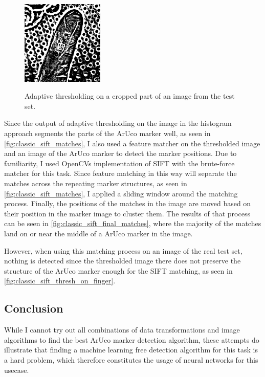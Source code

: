 \documentclass[10pt]{book}
\newcommand{\figureref}[1]{\autoref{#1}}
\begin{document}
\begin{figure}
  \caption{Adaptive thresholding on a cropped part of an image from the test set.}
  \includegraphics[width=0.35\textwidth]{image/classic_sift_thresh_on_finger}
  \label{fig:classic_sift_thresh_on_finger}
\end{figure}

Since the output of adaptive thresholding on the image in the histogram approach segments the parts of the \ac{ArUco} marker well, as seen in \figureref{fig:classic_sift_matches}, I also used a feature matcher on the thresholded image and an image of the \ac{ArUco} marker to detect the marker positions. Due to familiarity, I used \acp{OpenCV} implementation of \ac{SIFT} with the brute-force matcher for this task. Since feature matching in this way will separate the matches across the repeating marker structures, as seen in \figureref{fig:classic_sift_matches}, I applied a sliding window around the matching process. Finally, the positions of the matches in the image are moved based on their position in the marker image to cluster them. %
The results of that process can be seen in \figureref{fig:classic_sift_final_matches}, where the majority of the matches land on or near the middle of a \ac{ArUco} marker in the image. 

However, when using this matching process on an image of the real test set, nothing is detected since the thresholded image there does not preserve the structure of the \ac{ArUco} marker enough for the \ac{SIFT} matching, as seen in \figureref{fig:classic_sift_thresh_on_finger}.

\subsection{Conclusion}

While I cannot try out all combinations of data transformations and image algorithms to find the best \ac{ArUco} marker detection algorithm, these attempts do illustrate that finding a machine learning free detection algorithm for this task is a hard problem, which therefore constitutes the usage of neural networks for this usecase.
\end{document}
